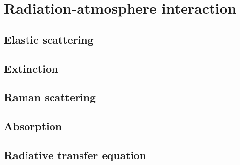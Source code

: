 \chapter{Radiation-atmosphere interaction}
\label{sect::sota_chapter3}

\section{Elastic scattering}

\section{Extinction}

\section{Raman scattering}

\section{Absorption}

\section{Radiative transfer equation}
